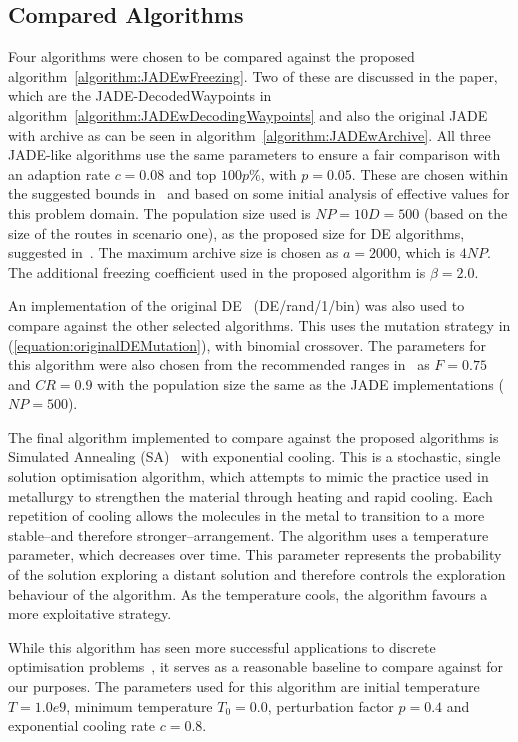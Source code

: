 \documentclass[10pt,a4paper, oneside, conference]{IEEEtran}
\begin{document}
	\subsection{Compared Algorithms}
	Four algorithms were chosen to be compared against the proposed algorithm~\ref{algorithm:JADEwFreezing}.
	Two of these are discussed in the paper, which are the JADE-DecodedWaypoints in algorithm~\ref{algorithm:JADEwDecodingWaypoints} and also the original JADE with archive as can be seen in algorithm~\ref{algorithm:JADEwArchive}.
	All three JADE-like algorithms use the same parameters to ensure a fair comparison with an adaption rate $c=0.08$ and top $100p\%$, with $p=0.05$. These are chosen within the suggested bounds in~\cite{Zhang2009} and based on some initial analysis of effective values for this problem domain.
	The population size used is $NP=10D=500$ (based on the size of the routes in scenario one), as the proposed size for DE algorithms, suggested in~\cite{Liu2005}. The maximum archive size is chosen as $a=2000$, which is $4NP$.
	The additional freezing coefficient used in the proposed algorithm is $\beta = 2.0$.
	
	An implementation of the original DE~\cite{storn1997differential} (DE/rand/1/bin) was also used to compare against the other selected algorithms.
	This uses the mutation strategy in (\ref{equation:originalDEMutation}), with binomial crossover.
	The parameters for this algorithm were also chosen from the recommended ranges in~\cite{Liu2005} as $F=0.75$ and $CR=0.9$ with the population size the same as the JADE implementations ($NP=500$).
	
	The final algorithm implemented to compare against the proposed algorithms is Simulated Annealing (SA)~\cite{S.KirkpatrickC.D.GelattJr.1983} with exponential cooling.
	This is a stochastic, single solution optimisation algorithm, which attempts to mimic the practice used in metallurgy to strengthen the material through heating and rapid cooling.
	Each repetition of cooling allows the molecules in the metal to transition to a more stable--and therefore stronger--arrangement.
	The algorithm uses a temperature parameter, which decreases over time.
	This parameter represents the probability of the solution exploring a distant solution and therefore controls the exploration behaviour of the algorithm.
	As the temperature cools, the algorithm favours a more exploitative strategy.
	
	While this algorithm has seen more successful applications to discrete optimisation problems~\cite{Kirkpatrick1984}, it serves as a reasonable baseline to compare against for our purposes.
	The parameters used for this algorithm are initial temperature $T=1.0e9$, minimum temperature $T_0=0.0$, perturbation factor $p=0.4$ and exponential cooling rate $c=0.8$.
	
\end{document}
